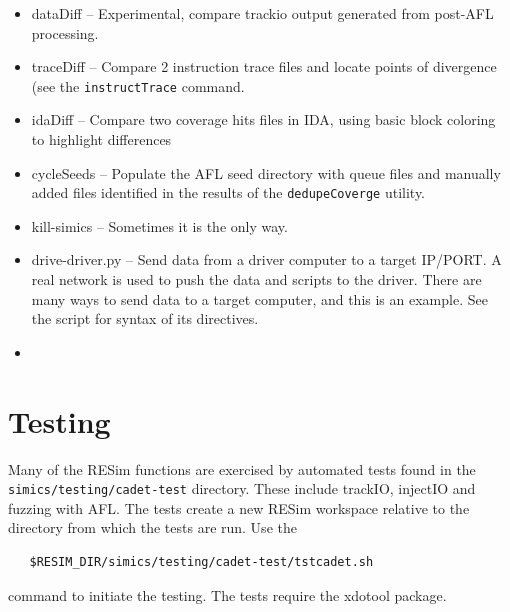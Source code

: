 \documentclass[titlepage]{article}
\begin{document}
\begin{itemize}
\item dataDiff -- Experimental, compare trackio output generated from post-AFL processing.
\item traceDiff -- Compare 2 instruction trace files and locate points of divergence (see the {\tt instructTrace} command.
\item idaDiff -- Compare two coverage hits files in IDA, using basic block coloring to highlight differences
\item cycleSeeds -- Populate the AFL seed directory with queue files and manually added files identified in the results of the {\tt dedupeCoverge} utility.
\item kill-simics -- Sometimes it is the only way.
\item drive-driver.py -- Send data from a driver computer to a target IP/PORT.  A real network is used to push the data and scripts
to the driver.  There are many ways to send data to a target computer, and this is an example.  See the script for syntax of its directives.
\item 
\end{itemize}

\section{Testing}
Many of the RESim functions are exercised by automated tests found in the {\tt simics/testing/cadet-test} directory.
These include trackIO, injectIO and fuzzing with AFL.  The tests create a new RESim workspace relative to
the directory from which the tests are run.  Use the
\begin{verbatim}
   $RESIM_DIR/simics/testing/cadet-test/tstcadet.sh
\end{verbatim}
\noindent command to initiate the testing.  The tests require the xdotool package.
\end{document}
